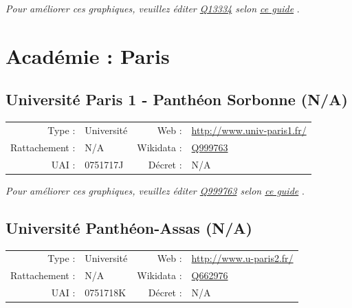 \documentclass[11pt,french,landscape]{article}
\begin{document}
\textit{\scriptsize Pour améliorer ces graphiques, veuillez éditer \href{https://www.wikidata.org/entity/Q13334}{Q13334}  selon \href{https://github.com/cpesr/wikidataESR/blob/master/Rmd/wikidataESR.md}{ce guide}}
.


\newpage

\hypertarget{acaduxe9mie-paris}{%
\section{Académie : Paris}\label{acaduxe9mie-paris}}

\hypertarget{universituxe9-paris-1---panthuxe9on-sorbonne-na}{%
\subsection{Université Paris 1 - Panthéon Sorbonne
(N/A)}\label{universituxe9-paris-1---panthuxe9on-sorbonne-na}}

\begin{tabular*}{0.45\textwidth}{rp{2cm}rl}  
\hline  
Type : & Université & Web : &\href{http://www.univ-paris1.fr/}{http://www.univ-paris1.fr/} \\  
Rattachement : & N/A & Wikidata : & \href{https://www.wikidata.org/entity/Q999763}{Q999763} \\  
UAI : & 0751717J & Décret : & N/A \\  
\hline  
\end{tabular*}

\textit{\scriptsize Pour améliorer ces graphiques, veuillez éditer \href{https://www.wikidata.org/entity/Q999763}{Q999763}  selon \href{https://github.com/cpesr/wikidataESR/blob/master/Rmd/wikidataESR.md}{ce guide}}
.


\newpage

\hypertarget{universituxe9-panthuxe9on-assas-na}{%
\subsection{Université Panthéon-Assas
(N/A)}\label{universituxe9-panthuxe9on-assas-na}}

\begin{tabular*}{0.45\textwidth}{rp{2cm}rl}  
\hline  
Type : & Université & Web : &\href{http://www.u-paris2.fr/}{http://www.u-paris2.fr/} \\  
Rattachement : & N/A & Wikidata : & \href{https://www.wikidata.org/entity/Q662976}{Q662976} \\  
UAI : & 0751718K & Décret : & N/A \\  
\hline  
\end{tabular*}
\end{document}

